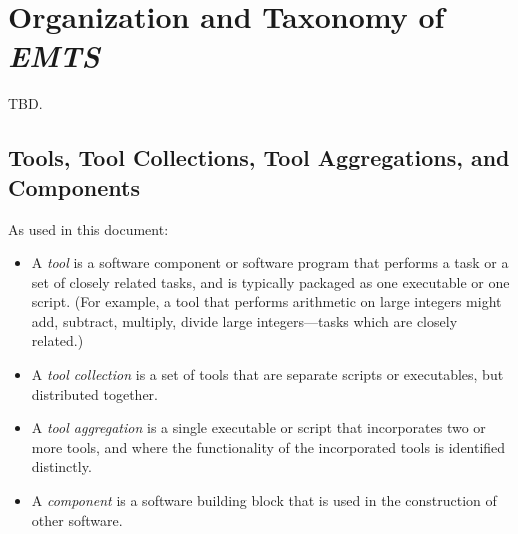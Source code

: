 \section{Organization and Taxonomy of \emph{EMTS}}
\label{ciov2:sote0}

TBD.


\subsection{Tools, Tool Collections, Tool Aggregations, and Components}
\label{ciov2:sote0:ssup0}

As used in this document:

\begin{itemize}
   \item A \emph{tool} is a software component
         or software program that performs a task or a set of closely related tasks, and is
         typically packaged as one executable or one script.
         (For example, a tool that performs arithmetic on large integers might add, subtract, multiply,
         divide large integers---tasks which are closely related.)
   \item A \emph{tool collection} is a set
         of tools that are separate scripts or executables, but distributed together.
   \item A \emph{tool aggregation} is a single executable or
         script that incorporates two or more tools, and where the functionality of the
         incorporated tools is identified distinctly.
   \item A \emph{component} is a software building block that
         is used in the construction of other software. 
\end{itemize}



